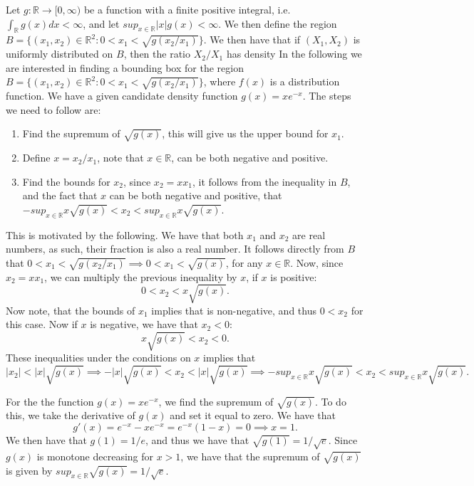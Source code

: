 \documentclass{article}
\theoremstyle{definition}
\theoremstyle{remark}
\begin{document}
Let $g : \mathbb{R} \to [0, \infty) $ be a function with a finite positive integral, i.e. $\int_\mathbb{R} g(x) dx < \infty$, and let $sup_{x\in \mathbb{R}} |x|g(x) < \infty$. We then define the region $B = \{(x_1,x_2) \in \mathbb{R}^2 : 0 < x_1 < \sqrt{g(x_2/x_1)}\}$. We then have that if $(X_1,X_2)$ is uniformly distributed on $B$, then the ratio $X_2/X_1$ has density
In the following we are interested in finding a bounding box for the region $B = \{(x_1,x_2) \in \mathbb{R}^2 : 0 < x_1 < \sqrt{g(x_2/x_1)}\}$, where $f(x)$ is a distribution function. We have a given candidate density function $g(x) = xe^{-x}$. The steps we need to follow are:
\begin{enumerate}
    
    \item Find the supremum of $\sqrt{g(x)}$, this will give us the upper bound for $x_1$.
    \item  Define $x = x_2/x_1$, note that $x\in \mathbb{R}$, can be both negative and positive.
    \item Find the bounds for $x_2$, since $x_2 = xx_1$, it follows from the inequality in $B$, and the fact that $x$ can be both negative and positive, that $ -sup_{x\in \mathbb{R}} x \sqrt{g(x)}< x_2 < sup_{x\in \mathbb{R}} x \sqrt{g(x)}$.
\end{enumerate}

This is motivated by the following. We have that both $x_1$ and $x_2$ are real numbers, as such, their fraction is also a real number. It follows directly from $B$ that $0 < x_1 < \sqrt{g(x_2/x_1)} \implies 0 < x_1 < \sqrt{g(x)}$, for any $x \in \mathbb{R}$. Now, since $x_2 = xx_1$, we can multiply the previous inequality by $x$, if $x$ is positive:
 $$0 < x_2 < x\sqrt{g(x)}.$$
Now note, that the bounds of $x_1$ implies that is non-negative, and thus $0 < x_2$ for this case. Now if $x$ is negative, we have that $x_2 < 0$:
 $$x\sqrt{g(x)} < x_2 < 0.$$
These inequalities under the conditions on $x$ implies that
$$
|x_2| < |x|\sqrt{g(x)} \implies -|x|\sqrt{g(x)} < x_2 < |x|\sqrt{g(x)} \implies
 -sup_{x\in \mathbb{R}} x \sqrt{g(x)}< x_2 < sup_{x\in \mathbb{R}} x \sqrt{g(x)}.
$$


For the the function $g(x) = xe^{-x}$, we find the supremum of $\sqrt{g(x)}$. To do this, we take the derivative of $g(x)$ and set it equal to zero. We have that
\begin{equation}
    g'(x) = e^{-x} - xe^{-x} = e^{-x}(1-x) = 0 \implies x = 1.
\end{equation}
We then have that $g(1) = 1/e$, and thus we have that $\sqrt{g(1)} = 1/\sqrt{e}$. Since $g(x)$ is monotone decreasing for $x > 1$, we have that the supremum of $\sqrt{g(x)}$ is given by $sup_{x\in \mathbb{R}} \sqrt{g(x)} = 1/\sqrt{e}$. 
\end{document}
